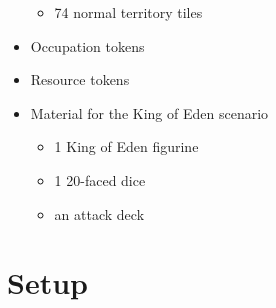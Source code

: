 \documentclass[a4paper]{article}
\begin{document}
\begin{itemize}
\begin{itemize}
                \item 74 normal territory tiles
            \end{itemize}
        \item Occupation tokens
        \item Resource tokens
        \item Material for the King of Eden scenario
            \begin{itemize}
                \item 1 King of Eden figurine
                \item 1 20-faced dice
                \item an attack deck
            \end{itemize}
    \end{itemize}



\section{Setup}
\end{document}
